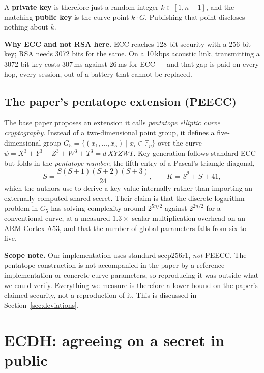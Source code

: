 A \textbf{private key} is therefore just a random integer $k \in [1, n-1]$, and the matching
\textbf{public key} is the curve point $k \cdot G$. Publishing that point discloses nothing
about $k$.

\begin{keybox}
\textbf{Why ECC and not RSA here.} ECC reaches 128-bit security with a 256-bit key; RSA
needs 3072 bits for the same. On a 10\,kbps acoustic link, transmitting a 3072-bit key costs
307\,ms against 26\,ms for ECC --- and that gap is paid on every hop, every session, out of
a battery that cannot be replaced.
\end{keybox}

\subsection{The paper's pentatope extension (PEECC)}

The base paper proposes an extension it calls \emph{pentatope elliptic curve cryptography}.
Instead of a two-dimensional point group, it defines a five-dimensional group
$G_5 = \{(x_1,\dots,x_5) \mid x_i \in \mathbb{F}_p\}$ over the curve
$\psi = X^3+Y^3+Z^3+W^3+T^3 = d\,XYZWT$. Key generation follows standard ECC but folds in
the \emph{pentatope number}, the fifth entry of a Pascal's-triangle diagonal,
\begin{equation}
S = \frac{S(S+1)(S+2)(S+3)}{24},
\qquad K = S^{2} + S + 41,
\end{equation}
which the authors use to derive a key value internally rather than importing an externally
computed shared secret. Their claim is that the discrete logarithm problem in $G_5$ has
solving complexity around $2^{5n/2}$ against $2^{2n/2}$ for a conventional curve, at a
measured $1.3\times$ scalar-multiplication overhead on an ARM Cortex-A53, and that the
number of global parameters falls from six to five.

\begin{warnbox}
\textbf{Scope note.} Our implementation uses standard secp256r1, \emph{not} PEECC. The
pentatope construction is not accompanied in the paper by a reference implementation or
concrete curve parameters, so reproducing it was outside what we could verify. Everything we
measure is therefore a lower bound on the paper's claimed security, not a reproduction of
it. This is discussed in Section~\ref{sec:deviations}.
\end{warnbox}

\section{ECDH: agreeing on a secret in public}

